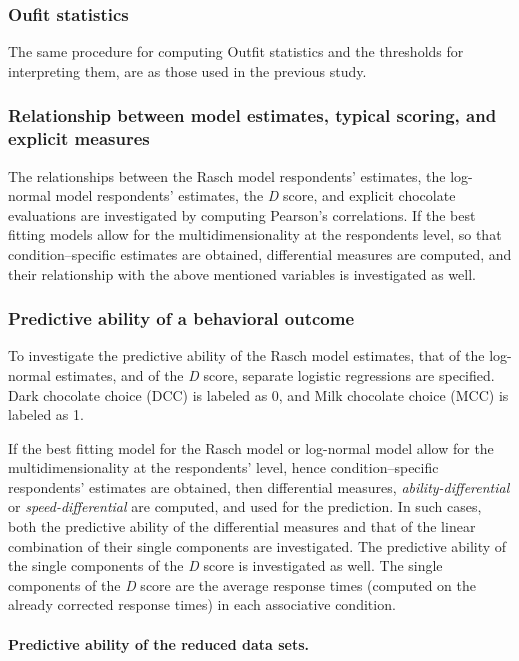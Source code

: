 \documentclass[12pt]{book}
\begin{document}
\subsubsection{Oufit statistics}

The same procedure for computing Outfit statistics and the thresholds for interpreting them, are as those used in the previous study. 

\subsubsection{Relationship between model estimates, typical scoring, and explicit measures}

The relationships between the Rasch model respondents' estimates, the log-normal model respondents' estimates, the \emph{D} score, and explicit chocolate evaluations are investigated by computing Pearson's correlations. 
If the best fitting models allow for the multidimensionality at the respondents level, so that condition--specific estimates are obtained, differential measures are computed, and their relationship with the above mentioned variables is investigated as well.   

\subsubsection{Predictive ability of a behavioral outcome}

To investigate the predictive ability of the Rasch model estimates, that of the log-normal estimates, and of the \emph{D} score, separate logistic regressions are specified. 
Dark chocolate choice (DCC) is labeled as 0, and Milk chocolate choice (MCC) is labeled as 1. 

If the best fitting model for the Rasch model or log-normal model allow for the multidimensionality at the respondents' level, hence condition--specific respondents' estimates are obtained, then differential measures, \emph{ability-differential} or \emph{speed-differential} are computed, and used for the prediction. 
In such cases, both the predictive ability of the differential measures and that of the linear combination of their single components are investigated. 
The predictive ability of the single components of the \emph{D} score is investigated as well. 
The single components of the \emph{D} score are the average response times (computed on the already corrected response times) in each associative condition.

\paragraph{Predictive ability of the reduced data sets.}
\end{document}
